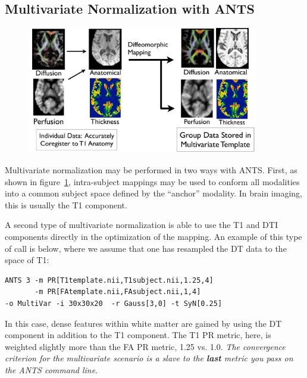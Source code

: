 \documentclass{InsightArticle}
\begin{document}
\subsection{Multivariate Normalization with ANTS}
\begin{figure}
\label{fig:mvnorm}
\includegraphics[width=0.9\textwidth]{Figures/multivariatenorm.pdf} 
\vspace{-0.1in}
\end{figure}
Multivariate normalization may be performed in two ways with ANTS.  
First, as shown in figure~\ref{fig:mvnorm}, intra-subject mappings may 
be used to conform all modalities into a common subject space defined by 
the ``anchor'' modality.  In brain imaging, this is usually the T1 component.  

A second type of multivariate normalization is able to use the T1 and DTI components 
directly in the optimization of the mapping.  An example of this type of call is below, 
where we assume that one has resampled the DT data to the space of T1: 
\begin{verbatim}
ANTS 3 -m PR[T1template.nii,T1subject.nii,1.25,4]
       -m PR[FAtemplate.nii,FAsubject.nii,1,4] 
-o MultiVar -i 30x30x20  -r Gauss[3,0] -t SyN[0.25]
\end{verbatim}
In this case, dense features within white matter are gained by using the DT component  
in addition to the T1 component.   The T1 PR metric, here, is weighted slightly more 
than the FA PR metric, 1.25 vs. 1.0.  {\em The convergence criterion for 
the multivariate scenario is a slave to the {\bf last} metric you 
pass on the ANTS command line}.
\end{document}
